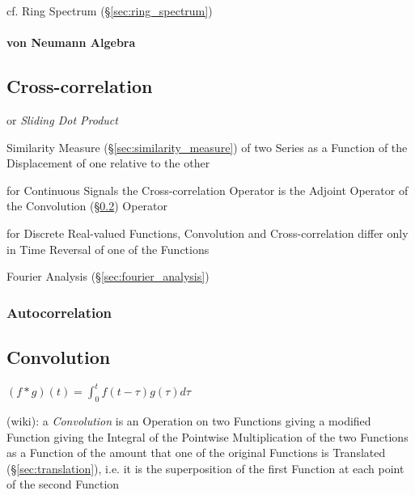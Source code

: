 cf. Ring Spectrum (\S\ref{sec:ring_spectrum})



\paragraph{von Neumann Algebra}\label{sec:vonneumann_algebra}\hfill



\subsection{Cross-correlation}\label{sec:cross_correlation}

or \emph{Sliding Dot Product}

Similarity Measure (\S\ref{sec:similarity_measure}) of two Series as a Function
of the Displacement of one relative to the other

for Continuous Signals the Cross-correlation Operator is the Adjoint Operator
of the Convolution (\S\ref{sec:convolution}) Operator

for Discrete Real-valued Functions, Convolution and Cross-correlation differ
only in Time Reversal of one of the Functions

\fist Fourier Analysis (\S\ref{sec:fourier_analysis})



\subsubsection{Autocorrelation}\label{sec:autocorrelation}



\subsection{Convolution}\label{sec:convolution}

$(f * g)(t) = \int_0^t f(t-\tau) g(\tau) d\tau$

(wiki): a \emph{Convolution} is an Operation on two Functions giving a modified
Function giving the Integral of the Pointwise Multiplication of the two
Functions as a Function of the amount that one of the original Functions is
Translated (\S\ref{sec:translation}), i.e. it is the superposition of the first
Function at each point of the second Function

